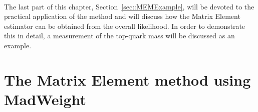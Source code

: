 \\
The last part of this chapter, Section~\ref{sec::MEMExample}, will be devoted to the practical application of the method and will discuss how the Matrix Element estimator can be obtained from the overall likelihood.
In order to demonstrate this in detail, a measurement of the top-quark mass will be discussed as an example.

\section{The Matrix Element method using MadWeight} \label{sec::MWTheory}

